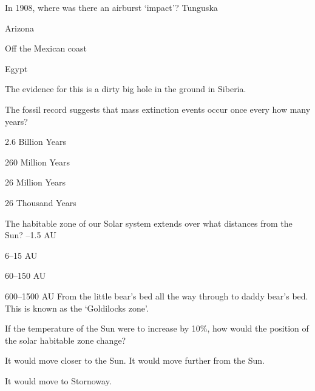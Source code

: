 \documentclass[compose]{exam-n}
\begin{document}
\begin{mcq}
In 1908, where was there an airburst `impact'?
\answer Tunguska
\item Arizona
\item Off the Mexican coast
\item Egypt
\begin{solution}
The evidence for this is a dirty big hole in the ground in Siberia.
\end{solution}
\end{mcq}

\begin{mcq}
The fossil record suggests that mass extinction events occur once every how many years?
\item 2.6 Billion Years
\item 260 Million Years
\item 26 Million Years %
\item 26 Thousand Years
\end{mcq}

\begin{mcq}
The habitable zone of our Solar system extends over what distances from the Sun?
--1.5 AU
\item 6--15 AU
\item 60--150 AU
\item 600--1500 AU
\answer From the little bear's bed all the way through to daddy bear's
  bed.  This is known as the `Goldilocks zone'.
\end{mcq}

\begin{mcq}
If the temperature of the Sun were to increase by 10\%, how would the
position of the solar habitable zone change?
\item It would move closer to the Sun.
\answer It would move further from the Sun.
\item It would move to Stornoway.
\end{mcq}
\end{document}
